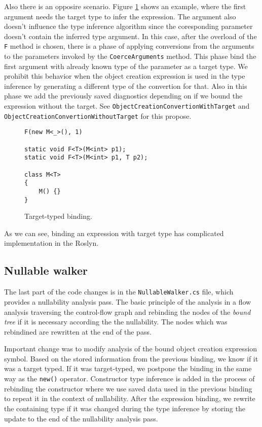 Also there is an opposire scenario.
Figure \ref{img72:targetBinding} shows an example, where the first argument needs the target type to infer the expression.
The argument also doesn't influence the type inference algorithm since the coresponding parameter doesn't contain the inferred type argument.
In this case, after the overload of the \texttt{F} method is chosen, there is a phase of applying conversions from the arguments to the parameters invoked by the \texttt{CoerceArguments} method.
This phase bind the first argument with already known type of the parameter as a target type.
We prohibit this behavior when the object creation expression is used in the type inference by generating a different type of the convertion for that.
Also in this phase we add the previously saved diagnostics depending on if we bound the expression without the target.
See \texttt{ObjectCreationConvertionWithTarget} and \texttt{ObjectCreationConvertionWithoutTarget} for this propose.
\begin{figure}[h]
\begin{lstlisting}[style=csharp, showstringspaces=false]
F(new M<_>(), 1)

static void F<T>(M<int> p1);
static void F<T>(M<int> p1, T p2);

class M<T> 
{
    M() {}
}
\end{lstlisting}
\caption{Target-typed binding.}
\label{img72:targetBinding}
\end{figure}
\par
As we can see, binding an expression with target type has complicated implementation in the Roslyn.

\subsection{Nullable walker}

The last part of the code changes is in the \texttt{NullableWalker.cs} file, which provides a nullability analysis pass.
The basic principle of the analysis in a flow analysis traversing the control-flow graph and rebinding the nodes of the \textit{bound tree} if it is necessary according the the nullability.
The nodes which was rebindined are rewritten at the end of the pass.
\par
Important change was to modify analysis of the bound object creation expression symbol.
Based on the stored information from the previous binding, we know if it was a target typed.
If it was target-typed, we postpone the binding in the same way as the \texttt{new()} operator.
Constructor type inference is added in the process of rebinding the constructor where we use saved data used in the previous binding to repeat it in the context of nullability.
After the expression binding, we rewrite the containing type if it was changed during the type inference by storing the update to the end of the nullability analysis pass.